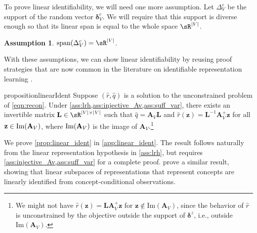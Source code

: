 \documentclass{article}
\newtheorem{assumption}{Assumption}    %
\newcommand{\z}{\mathbf{z}}
\newcommand{\A}{\mathbf{A}}
\newcommand{\deltaBold}{\boldsymbol{\delta}}
\newcommand{\deltaz}{\deltaBold^z}
\newcommand{\deltac}{\deltaBold^c}
\newcommand{\sj}[1]{\textcolor{violet}{\textbf{sj:} #1}}
\newcommand{\seb}[1]{\textcolor{cyan}{[\textbf{SL:} #1]}}
\begin{document}
To prove linear identifiability, we will need one more assumption. Let $\Delta_V^c$ be the support of the random vector $\deltac_V$. We will require that this support is diverse enough so that its linear span is equal to the whole space $\sR^{|V|}$.
\begin{assumption}\label{ass:suff_var}
    $\text{span}(\Delta_V^c) = \sR^{|V|}$.
\end{assumption}
With these assumptions, we can show linear identifiability by reusing proof strategies that are now common in the literature on identifiable representation learning \citep{iVAEkhemakhem20a,roeder2021linear,ahuja2022weakly,xu2024sparsityprinciplepartiallyobservable}.

\begin{restatable}{proposition}{linearIdent}\label{prop:linear_ident}
    Suppose $(\hat r, \hat q)$ is a solution to the unconstrained problem of \cref{eqn:recon}. Under \cref{ass:lrh,ass:injective_Av,ass:suff_var}, there  exists an invertible matrix $\mathbf{L} \in \sR^{|V|\times|V|}$ such that $\hat q = \A_V\mathbf{L}$ and $\hat{r}(\z) = \mathbf{L}^{-1}\A_V^+\z$ for all $\z \in \textnormal{Im}(\A_V)$, where $\textnormal{Im}(\A_V)$ is the image of $\A_V$.\footnote{We might not have $\hat{r}(\z) = \mathbf{L}\A_V^+\z$ for $\z \not\in \text{Im}(\A_V)$, since the behavior of $\hat{r}$ is unconstrained by the objective outside the support of $\deltaz$, i.e., outside $\text{Im}(\A_V)$.}
\end{restatable}
We prove \cref{prop:linear_ident} in \cref{app:linear_ident}. The result follows naturally from the linear representation hypothesis in \cref{ass:lrh}, but requires \cref{ass:injective_Av,ass:suff_var} for a complete proof. \citet{rajendran2024learning} prove a similar result, showing that linear subspaces of representations that represent concepts are linearly identified from concept-conditional observations.


\end{document}
